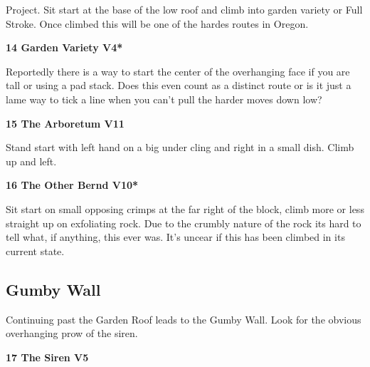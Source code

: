 \begin{multicols}{2}
					\begin{adjustwidth}{0.5cm}{}				
					Project. Sit start at the base of the low roof and climb into garden variety or Full Stroke. Once climbed this will be one of the hardes routes in Oregon.
					\end{adjustwidth}

					\label{rt:Garden Variety}
\colorbox{RoyalBlue!20}{
\parbox{0.95\linewidth}{
\textbf{
14 Garden Variety V4*  
}
}
}

					\begin{adjustwidth}{0.5cm}{}				
					Reportedly there is a way to start the center of the overhanging face if you are tall or using a pad stack. Does this even count as a distinct route or is it just a lame way to tick a line when you can't pull the harder moves down low?
					\end{adjustwidth}
					\label{rt:The Arboretum}
\colorbox{red!20}{
\parbox{0.95\linewidth}{
\textbf{
15 The Arboretum V11     
}
}
}

					\begin{adjustwidth}{0.5cm}{}				
					Stand start with left hand on a big under cling and right in a small dish. Climb up and left.
					\end{adjustwidth}
					\label{rt:The Other Bernd}
\colorbox{red!20}{
\parbox{0.95\linewidth}{
\textbf{
16 The Other Bernd V10*  
}
}
}

					\begin{adjustwidth}{0.5cm}{}				
					Sit start on small opposing crimps at the far right of the block, climb more or less straight up on exfoliating rock. Due to the crumbly nature of the rock its hard to tell what, if anything, this ever was. It's uncear if this has been climbed in its current state.
					\end{adjustwidth}
			\subsection*{Gumby Wall}\label{bf:Gumby Wall}
			Continuing past the Garden Roof leads to the Gumby Wall. Look for the obvious overhanging prow of the siren.\\
			

					\label{rt:The Siren}
\colorbox{RoyalBlue!20}{
\parbox{0.95\linewidth}{
\textbf{
17 The Siren V5     
}
}
}


\end{multicols}
